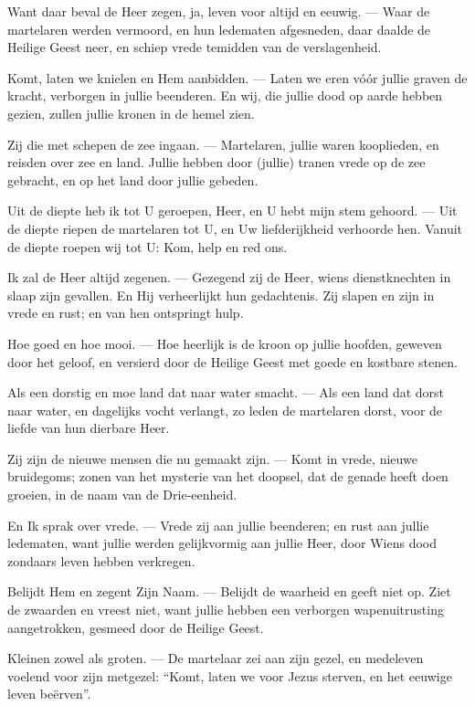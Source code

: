 \documentclass[12pt,twoside,a5paper]{article}
\begin{document}
\begin{halfparskip}
  Want daar beval de Heer zegen, ja, leven voor altijd en eeuwig. --- Waar de martelaren werden vermoord, en hun ledematen afgesneden, daar daalde de Heilige Geest neer, en schiep vrede temidden van de verslagenheid.

  Komt, laten we knielen en Hem aanbidden. --- Laten we eren vóór jullie graven de kracht, verborgen in jullie beenderen. En wij, die jullie dood op aarde hebben gezien, zullen jullie kronen in de hemel zien.

  Zij die met schepen de zee ingaan. --- Martelaren, jullie waren kooplieden, en reisden over zee en land. Jullie hebben door (jullie) tranen vrede op de zee gebracht, en op het land door jullie gebeden.

  Uit de diepte heb ik tot U geroepen, Heer, en U hebt mijn stem gehoord. --- Uit de diepte riepen de martelaren tot U, en Uw liefderijkheid verhoorde hen. Vanuit de diepte roepen wij tot U: Kom, help en red ons.

  Ik zal de Heer altijd zegenen. --- Gezegend zij de Heer, wiens dienstknechten in slaap zijn gevallen. En Hij verheerlijkt hun gedachtenis. Zij slapen en zijn in vrede en rust; en van hen ontspringt hulp.

  Hoe goed en hoe mooi. --- Hoe heerlijk is de kroon op jullie hoofden, geweven door het geloof, en versierd door de Heilige Geest met goede en kostbare stenen.

  Als een dorstig en moe land dat naar water smacht. --- Als een land dat dorst naar water, en dagelijks vocht verlangt, zo leden de martelaren dorst, voor de liefde van hun dierbare Heer.

  Zij zijn de nieuwe mensen die nu gemaakt zijn. --- Komt in vrede, nieuwe bruidegoms; zonen van het mysterie van het doopsel, dat de genade heeft doen groeien, in de naam van de Drie-eenheid.

  En Ik sprak over vrede. --- Vrede zij aan jullie beenderen; en rust aan jullie ledematen, want jullie werden gelijkvormig aan jullie Heer, door Wiens dood zondaars leven hebben verkregen.

  Belijdt Hem en zegent Zijn Naam. --- Belijdt de waarheid en geeft niet op. Ziet de zwaarden en vreest niet, want jullie hebben een verborgen wapenuitrusting aangetrokken, gesmeed door de Heilige Geest.

  Kleinen zowel als groten. --- De martelaar zei aan zijn gezel, en medeleven voelend voor zijn metgezel: ``Komt, laten we voor Jezus sterven, en het eeuwige leven beërven''.


\end{halfparskip}
\end{document}
